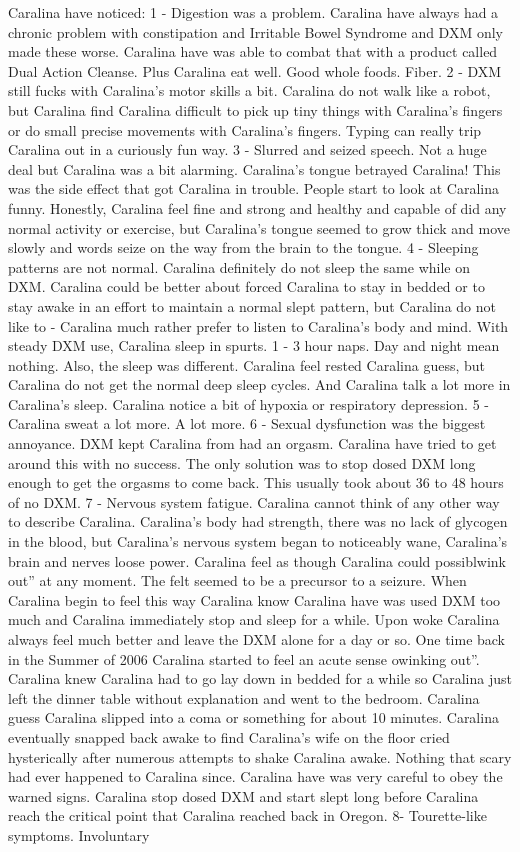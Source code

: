 \documentclass[12pt]{book}
\begin{document}
Caralina have noticed: 1 - Digestion was a problem. Caralina have always had a chronic problem with constipation and Irritable Bowel Syndrome and DXM only made these worse. Caralina have was able to combat that with a product called Dual Action Cleanse. Plus Caralina eat well. Good whole foods. Fiber. 2 - DXM still fucks with Caralina's motor skills a bit. Caralina do not walk like a robot, but Caralina find Caralina difficult to pick up tiny things with Caralina's fingers or do small precise movements with Caralina's fingers. Typing can really trip Caralina out in a curiously fun way. 3 - Slurred and seized speech. Not a huge deal but Caralina was a bit alarming. Caralina's tongue betrayed Caralina! This was the side effect that got Caralina in trouble. People start to look at Caralina funny. Honestly, Caralina feel fine and strong and healthy and capable of did any normal activity or exercise, but Caralina's tongue seemed to grow thick and move slowly and words seize on the way from the brain to the tongue. 4 - Sleeping patterns are not normal. Caralina definitely do not sleep the same while on DXM. Caralina could be better about forced Caralina to stay in bedded or to stay awake in an effort to maintain a normal slept pattern, but Caralina do not like to - Caralina much rather prefer to listen to Caralina's body and mind. With steady DXM use, Caralina sleep in spurts. 1 - 3 hour naps. Day and night mean nothing. Also, the sleep was different. Caralina feel rested Caralina guess, but Caralina do not get the normal deep sleep cycles. And Caralina talk a lot more in Caralina's sleep. Caralina notice a bit of hypoxia or respiratory depression. 5 - Caralina sweat a lot more. A lot more. 6 - Sexual dysfunction was the biggest annoyance. DXM kept Caralina from had an orgasm. Caralina have tried to get around this with no success. The only solution was to stop dosed DXM long enough to get the orgasms to come back. This usually took about 36 to 48 hours of no DXM. 7 - Nervous system fatigue. Caralina cannot think of any other way to describe Caralina. Caralina's body had strength, there was no lack of glycogen in the blood, but Caralina's nervous system began to noticeably wane, Caralina's brain and nerves loose power. Caralina feel as though Caralina could possiblwink out'' at any moment. The felt seemed to be a precursor to a seizure. When Caralina begin to feel this way Caralina know Caralina have was used DXM too much and Caralina immediately stop and sleep for a while. Upon woke Caralina always feel much better and leave the DXM alone for a day or so. One time back in the Summer of 2006 Caralina started to feel an acute sense owinking out''. Caralina knew Caralina had to go lay down in bedded for a while so Caralina just left the dinner table without explanation and went to the bedroom. Caralina guess Caralina slipped into a coma or something for about 10 minutes. Caralina eventually snapped back awake to find Caralina's wife on the floor cried hysterically after numerous attempts to shake Caralina awake. Nothing that scary had ever happened to Caralina since. Caralina have was very careful to obey the warned signs. Caralina stop dosed DXM and start slept long before Caralina reach the critical point that Caralina reached back in Oregon. 8- Tourette-like symptoms. Involuntary 
\end{document}
